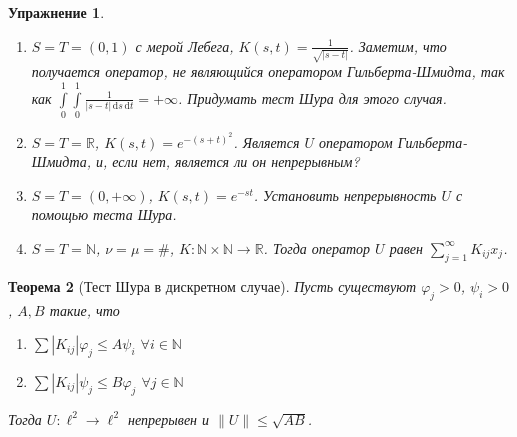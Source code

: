\documentclass[11pt,openany,a4paper]{scrartcl}
\theoremstyle{plain}
\newtheorem{theorem}{Теорема}[section]
\newtheorem{exercise}[theorem]{Упражнение}
\theoremstyle{definition}
\newcommand\mb{\mathbb}
\newcommand\real{\mb R}
\newcommand{\dif}{\, \mathrm d}
\begin{document}
\begin{exercise}
\mbox{}
    \begin{enumerate}
        \item $S = T = (0, 1)$ с мерой Лебега, $K(s,t) = \frac{1}{\sqrt{|s-t|}}$.
        Заметим, что получается оператор, не являющийся
        оператором Гильберта-Шмидта, так как
        $\int\limits_0^1\int\limits_0^1 \frac{1}{|s-t|\dif s\dif t} = +\infty$.
        Придумать тест Шура для этого случая.
        \item $S = T = \real$, $K(s,t) = e^{-(s + t)^2}$. Является $U$ оператором
        Гильберта-Шмидта, и, если нет, является ли он непрерывным?
        \item $S = T = (0, +\infty)$, $K(s,t) = e^{-st}$. Установить непрерывность
        $U$ с помощью теста Шура.
        \item $S = T = \mb N$, $\nu = \mu = \#$,
        $K: \mb N \times \mb N \to \real$. Тогда оператор $U$ равен
        $\sum\limits_{j=1}^\infty K_{ij}x_j$.
    \end{enumerate}
\end{exercise}
\begin{theorem}[Тест Шура в дискретном случае]
    Пусть существуют $\varphi_j > 0$, $\psi_i > 0$, $A, B$ такие, что
    \begin{enumerate}
        \item $\sum |K_{ij}|\varphi_j \leqslant A\psi_i$ $\forall i \in \mb N$
        \item $\sum |K_{ij}|\psi_j \leqslant B\varphi_j$ $\forall j \in \mb N$
    \end{enumerate}
    Тогда $U: \ell^2 \to \ell^2$ непрерывен и $\|U\| \leqslant \sqrt{AB}$.
\end{theorem}
\end{document}

